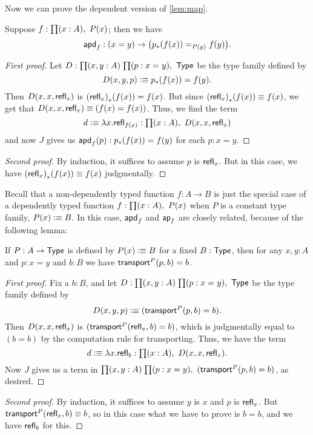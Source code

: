 Now we can prove the dependent version of \autoref{lem:map}.

\begin{lem}\label{lem:mapdep}
  Suppose $f:\prd{x: A} P(x)$; then we have
  \[\apdfunc f :(x=y) \to \big(\id[P(y)]{\trans p{f(x)}}{f(y)}\big).\]
\end{lem}

\begin{proof}[First proof]
  Let $D:\prd{x,y:A}{p:\id{x}{y}} \type$ be the type family defined by
  \begin{equation*}
    D(x,y,p)\defeq \trans p {f(x)}= f(y).
  \end{equation*}
  Then $D(x,x,\refl{x})$ is $\trans{(\refl{x})}{f(x)}= f(x)$.
  But since $\trans{(\refl{x})}{f(x)}\jdeq f(x)$, we get that $D(x,x,\refl{x})\jdeq (f(x)= f(x))$.
  Thus, we find the term
  \begin{equation*}
    d\defeq\lambda x.\refl{f(x)}:\prd{x:A} D(x,x,\refl{x})
  \end{equation*}
  and now $J$ gives us $\apdfunc f(p):\trans p{f(x)}= f(y)$ for each $p:x= y$.
\end{proof}

\begin{proof}[Second proof]
  By induction, it suffices to assume $p$ is $\refl x$.
  But in this case, we have $\trans{(\refl{x})}{f(x)}\jdeq f(x)$ judgmentally.
\end{proof}

Recall that a non-dependently typed function $f:A\to B$ is just the special case of a dependently typed function $f:\prd{x:A} P(x)$ when $P$ is a constant type family, $P(x) \defeq B$.
In this case, $\apdfunc{f}$ and $\apfunc{f}$ are closely related, because of the following lemma:

\begin{lem}\label{thm:trans-trivial}
  If $P:A\to\type$ is defined by $P(x) \defeq B$ for a fixed $B:\type$, then for any $x,y:A$ and $p:x=y$ and $b:B$ we have $\transfib P p b = b$.
\end{lem}
\begin{proof}[First proof]
  Fix a $b:B$, and let $D:\prd{x,y:A}{p:\id{x}{y}} \type$ be the type family defined by
  \[ D(x,y,p) \defeq (\transfib P p b = b). \]
  Then $D(x,x,\refl x)$ is $(\transfib P{\refl{x}}{b} = b)$, which is judgmentally equal to $(b=b)$ by the computation rule for transporting.
  Thus, we have the term
  \[ d \defeq \lambda x.\refl{b} : \prd{x:A} D(x,x,\refl x). \]
  Now $J$ gives us a term in $\prd{x,y:A}{p:x=y}(\transfib P p b = b)$, as desired.
\end{proof}
\begin{proof}[Second proof]
  By induction, it suffices to assume $y$ is $x$ and $p$ is $\refl x$.
  But $\transfib P {\refl x} b \jdeq b$, so in this case what we have to prove is $b=b$, and we have $\refl{b}$ for this.
\end{proof}

